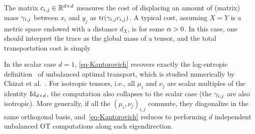 The matrix $c_{i,j} \in \mathbb{R}^{d \times d}$ measures the cost of displacing an amount of (matrix) mass $\gamma_{i,j}$ between $x_i$ and $y_j$  as $\operatorname{tr}(\gamma_{i,j}c_{i,j})$. %
%
A typical cost, assuming $X=Y$ is a metric space endowed with a distance $d_X$, is
for some $\alpha>0$.  In this case, one should interpret the trace as the global mass of a tensor, and the total transportation cost is simply 


\begin{rem}[Classical OT]\label{rem-classical-ot}
	In the scalar case $d=1$, \eqref{eq-Kantorovich} recovers exactly the log-entropic definition~\cite{LieroMielkeSavareLong} of unbalanced optimal transport, which is studied numerically by Chizat et al.~. %
	For isotropic tensors, i.e., all $\mu_i$ and $\nu_j$ are scalar multiples of the identity $\mathrm{Id}_{d \times d}$, the computation also collapses to the scalar case (the $\gamma_{i,j}$ are also isotropic). More generally, if all the $(\mu_i,\nu_j)_{i,j}$ commute, they diagonalize in the same orthogonal basis, and~\eqref{eq-Kantorovich} reduces to performing $d$ independent unbalanced OT computations along each eigendirection. 
\end{rem}

